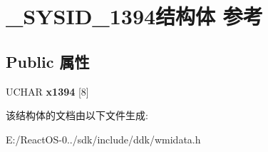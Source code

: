 \hypertarget{struct___s_y_s_i_d__1394}{}\section{\+\_\+\+S\+Y\+S\+I\+D\+\_\+1394结构体 参考}
\label{struct___s_y_s_i_d__1394}
\subsection*{Public 属性}
\begin{DoxyCompactItemize}
\item 
\mbox{\label{struct___s_y_s_i_d__1394_a2fec20d130072ce09d7f0e754f8fc7ea}} 
U\+C\+H\+AR {\bfseries x1394} \mbox{[}8\mbox{]}
\end{DoxyCompactItemize}


该结构体的文档由以下文件生成\+:\begin{DoxyCompactItemize}
\item 
E\+:/\+React\+O\+S-\/0../sdk/include/ddk/wmidata.\+h\end{DoxyCompactItemize}
